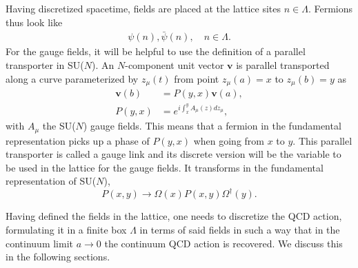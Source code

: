 Having discretized spacetime, fields are placed at the lattice sites $n\in\Lambda$. Fermions thus look like
\begin{gather}
\psi(n),\bar{\psi}(n), \quad
n\in\Lambda.
\end{gather}
For the gauge fields, it will be helpful to use the definition of a parallel transporter in SU($N$). An $N$-component unit vector $\boldsymbol{v}$ is parallel transported along a curve parameterized by $z_{\mu}(t)$ from point $z_{\mu}(a)=x$ to $z_{\mu}(b)=y$ as
\begin{align}
\boldsymbol{v}(b)&=P(y,x)\boldsymbol{v}(a),\\
P(y,x)&=e^{i\int_x^yA_{\mu}(z)dz_{\mu}},
\end{align}
with $A_{\mu}$ the SU($N$) gauge fields. This means that a fermion in the fundamental representation picks up a phase of $P(y,x)$ when going from $x$ to $y$. This parallel transporter is called a gauge link and its discrete version will be the variable to be used in the lattice for the gauge fields. It transforms in the fundamental representation of SU($N$),
\begin{equation}
P(x,y)\to\Omega(x)P(x,y)\Omega^{\dagger}(y).
\end{equation}

Having defined the fields in the lattice, one needs to discretize the QCD action, formulating it in a finite box $\Lambda$ in terms of said fields in such a way that in the continuum limit $a\rightarrow 0$ the continuum QCD action is recovered. We discuss this in the following sections.	

